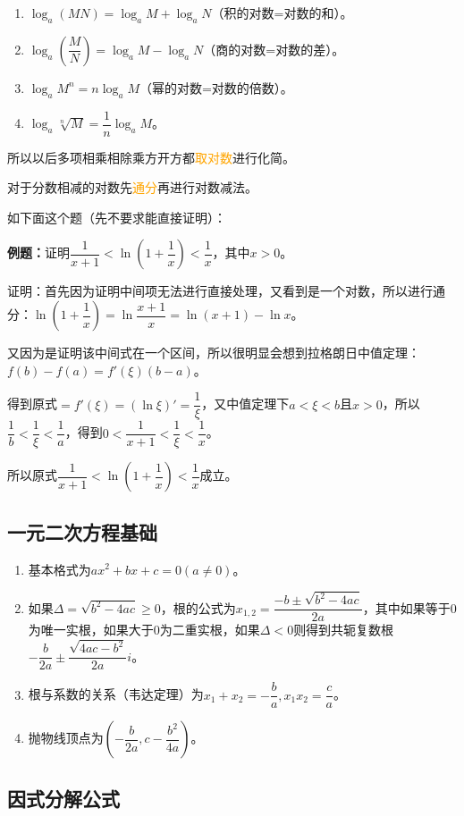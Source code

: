\documentclass[UTF8, 12pt]{ctexart}
\begin{document}
\begin{enumerate}
    \item $\log_a(MN)=\log_aM+\log_aN$（积的对数=对数的和）。
    \item $\log_a(\dfrac{M}{N})=\log_aM-\log_aN$（商的对数=对数的差）。
    \item $\log_aM^n=n\log_aM$（幂的对数=对数的倍数）。
    \item $\log_a\sqrt[n]{M}=\dfrac{1}{n}\log_aM$。
\end{enumerate}

所以以后多项相乘相除乘方开方都\textcolor{orange}{取对数}进行化简。

对于分数相减的对数先\textcolor{orange}{通分}再进行对数减法。

如下面这个题（先不要求能直接证明）：

\textbf{例题：}证明$\dfrac{1}{x+1}<\ln(1+\dfrac{1}{x})<\dfrac{1}{x}$，其中$x>0$。

证明：首先因为证明中间项无法进行直接处理，又看到是一个对数，所以进行通分：$\ln(1+\dfrac{1}{x})=\ln\dfrac{x+1}{x}=\ln(x+1)-\ln x$。

又因为是证明该中间式在一个区间，所以很明显会想到拉格朗日中值定理：$f(b)-f(a)=f'(\xi)(b-a)$。

得到原式$=f'(\xi)=(\ln\xi)'=\dfrac{1}{\xi}$，又中值定理下$a<\xi<b$且$x>0$，所以$\dfrac{1}{b}<\dfrac{1}{\xi}<\dfrac{1}{a}$，得到$0<\dfrac{1}{x+1}<\dfrac{1}{\xi}<\dfrac{1}{x}$。

所以原式$\dfrac{1}{x+1}<\ln(1+\dfrac{1}{x})<\dfrac{1}{x}$成立。

\subsection{一元二次方程基础}

\begin{enumerate}
    \item 基本格式为$ax^2+bx+c=0(a\neq 0)$。
    \item 如果$\Delta=\sqrt{b^2-4ac}\geqslant 0$，根的公式为$x_{1,2}=\dfrac{-b\pm\sqrt{b^2-4ac}}{2a}$，其中如果等于0为唯一实根，如果大于0为二重实根，如果$\Delta<0$则得到共轭复数根$-\dfrac{b}{2a}\pm\dfrac{\sqrt{4ac-b^2}}{2a}i$。
    \item 根与系数的关系（韦达定理）为$x_1+x_2=-\dfrac{b}{a},x_1x_2=\dfrac{c}{a}$。
    \item 抛物线顶点为$(-\dfrac{b}{2a},c-\dfrac{b^2}{4a})$。
\end{enumerate}

\subsection{因式分解公式}
\end{document}

